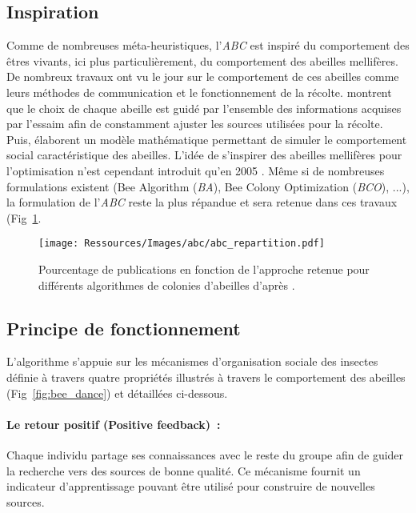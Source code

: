 \subsection{Inspiration} %
\label{sub:inspiration}
Comme de nombreuses méta-heuristiques, l’\textit{ABC} est inspiré du comportement des êtres
vivants, ici plus particulièrement, du comportement des abeilles mellifères. De
nombreux travaux ont vu le jour sur le comportement de ces abeilles comme leurs méthodes
de communication et le fonctionnement de la récolte. \textcite{Visscher19821790} montrent
que le choix de chaque abeille est guidé par l’ensemble des informations acquises
par l’essaim afin de constamment ajuster les sources utilisées pour la récolte.
Puis, \textcite{Camazine1991547} élaborent un modèle mathématique permettant de simuler
le comportement social caractéristique des abeilles.
L’idée de s’inspirer des abeilles mellifères pour l’optimisation n’est cependant introduit
qu’en 2005 \parencite{Karaboga2005}. Même si de nombreuses formulations existent (Bee
Algorithm (\textit{BA}), Bee Colony Optimization (\textit{BCO}), ...), la formulation de
l’\textit{ABC} reste la plus répandue et sera retenue dans ces travaux (Fig~\ref{fig:abc_repartition}.

\begin{figure}
    \begin{center}
        \texttt{[image: Ressources/Images/abc/abc\_repartition.pdf]}
    \end{center}
    \caption{Pourcentage de publications en fonction de l’approche retenue pour différents
             algorithmes de colonies d’abeilles d’après \cite{Karaboga201221}.
             \label{fig:abc_repartition}}
\end{figure}


\subsection{Principe de fonctionnement} %
\label{sub:principe_de_fonctionnement}
L’algorithme s’appuie sur les mécanismes d’organisation sociale des insectes
\parencite{Bonabeau1999} définie à travers quatre propriétés illustrés à travers le
comportement des abeilles (Fig~\ref{fig:bee_dance}) et détaillées ci-dessous.

\paragraph{Le retour positif (Positive feedback)~:} %
\label{par:positive_feedback}
Chaque individu partage ses connaissances avec le reste du groupe afin de guider
la recherche vers des sources de bonne qualité. Ce mécanisme fournit un indicateur
d’apprentissage pouvant être utilisé pour construire de nouvelles sources.

